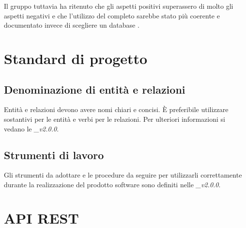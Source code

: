 \documentclass[12pt,a4paper]{article}
\begin{document}
Il gruppo tuttavia ha ritenuto che gli aspetti positivi superassero di molto gli aspetti negativi e che l'utilizzo del  completo sarebbe stato più coerente e documentato invece di scegliere un database .

\newpage
\section{Standard di progetto}



\subsection{Denominazione di entità e relazioni}
Entità e relazioni devono avere nomi chiari e concisi. È preferibile utilizzare sostantivi per le entità e verbi per le relazioni. Per ulteriori informazioni si vedano le \textit{\NdP\_v2.0.0}.

\subsection{Strumenti di lavoro}
Gli strumenti da adottare e le procedure da seguire per utilizzarli correttamente durante la realizzazione  del prodotto software sono definiti nelle \textit{\NdP\_v2.0.0}.

\newpage

\section{API REST}


\newpage

\end{document}
